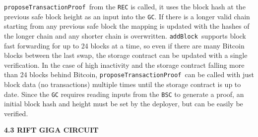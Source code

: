 \documentclass[
]{article}
\newcommand{\code}[1]{\texttt{#1}}
\begin{document}
\hspace*{3em}{The next time }\code{proposeTransactionProof }{from the \code{REC} is called, it
uses the block hash at the previous safe block height as an input into the \code{GC}. If
there is a longer valid chain starting from any previous safe block the mapping is updated with the hashes of
the longer chain and any shorter chain is overwritten. }\code{addBlock }{supports block fast forwarding for up to 24 blocks at a time, so even if there are many Bitcoin blocks between the last swap, the storage contract can be updated with a single verification. In the case of high inactivity and the storage contract falling more than 24 blocks behind Bitcoin, }\code{proposeTransactionProof }{can be called with just block data (no transactions) multiple times until the storage contract is up to date. Since the \code{GC} requires reading inputs from the \code{BSC} to generate a proof, an initial block hash and height must be set by the deployer, but can be easily be verified.}

{}
\vspace*{\baselineskip}
\begin{center}
\textbf{4.3 RIFT GIGA CIRCUIT}
\end{center}

\vspace*{\baselineskip}

{}
\end{document}
